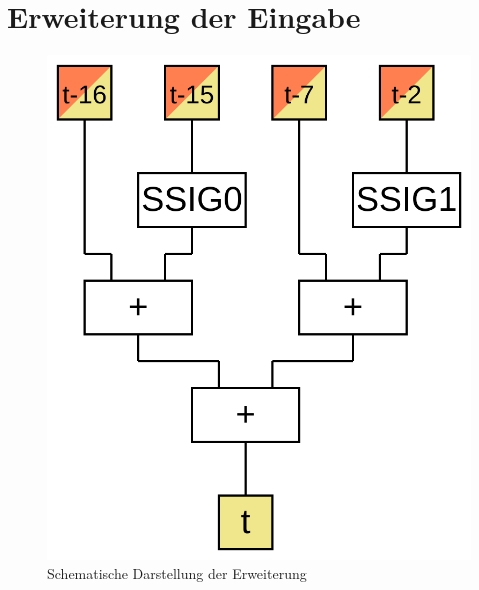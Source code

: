\section{Erweiterung der Eingabe}
\label{sec:sha256:erweiterung}


\begin{figure}[!h]
  \centering
  \includegraphics[scale=0.4]{images/sha256prep}
  \caption{Schematische Darstellung der Erweiterung}
  \label{fig:sha256prep}
\end{figure}